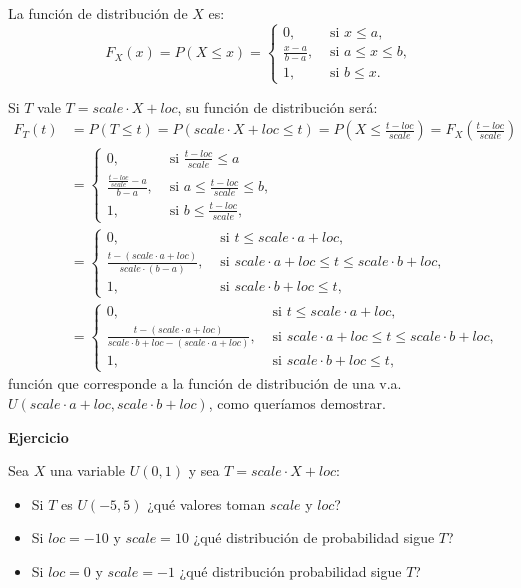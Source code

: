 \documentclass[
  letterpaper,
  DIV=11,
  numbers=noendperiod]{scrreprt}
\begin{document}
La función de distribución de \(X\) es: \[
F_X(x)=P(X\leq x)=\left\{\begin{array}{ll} 0, & \mbox{ si } x\leq a,\\\frac{x-a}{b-a}, & \mbox{ si } a\leq x\leq b, \\1, & \mbox{ si } b\leq x.\end{array}\right.
\]

Si \(T\) vale \(T=scale\cdot X+loc\), su función de distribución será:
\[
\begin{array}{rl}
F_T(t)&=P(T\leq t)= P(scale\cdot X+ loc\leq t)= P\left(X\leq \frac{t-loc}{scale}\right)=F_X\left(\frac{t-loc}{scale}\right)\\
&=
\left\{\begin{array}{ll} 0, & \mbox{ si } \frac{t-loc}{scale}\leq a\\\frac{\frac{t-loc}{scale}-a}{b-a}, & \mbox{ si } a\leq \frac{t-loc}{scale}\leq b,\\1, & \mbox{ si } b\leq \frac{t-loc}{scale},\end{array}\right. \\ & =
\left\{\begin{array}{ll} 0, & \mbox{ si }  t\leq scale\cdot a +loc, \\
\frac{t-(scale\cdot a+loc)}{scale\cdot (b-a)}, & \mbox{ si } scale\cdot a+loc \leq t\leq scale\cdot b+loc, \\
1, & \mbox{ si } scale\cdot b+loc\leq t, \end{array}\right.\\
& = 
\left\{\begin{array}{ll} 0, & \mbox{ si }  t\leq scale\cdot a +loc, \\
\frac{t-(scale\cdot a+loc)}{scale\cdot b+loc-(scale\cdot a+loc)}, & \mbox{ si } scale\cdot a+loc \leq t\leq scale\cdot b+loc, \\
1, & \mbox{ si } scale\cdot b+loc\leq t,\end{array}\right.
\end{array}
\] función que corresponde a la función de distribución de una v.a.
\(U(scale\cdot a+loc,scale\cdot b+loc)\), como queríamos demostrar.

\textbf{Ejercicio}

Sea \(X\) una variable \(U(0,1)\) y sea \(T=scale\cdot X+loc\):

\begin{itemize}
\item
  Si \(T\) es \(U(-5,5)\) ¿qué valores toman \(scale\) y \(loc\)?
\item
  Si \(loc=-10\) y \(scale=10\) ¿qué distribución de probabilidad sigue
  \(T\)?
\item
  Si \(loc=0\) y \(scale=-1\) ¿qué distribución probabilidad sigue
  \(T\)?
\end{itemize}
\end{document}

